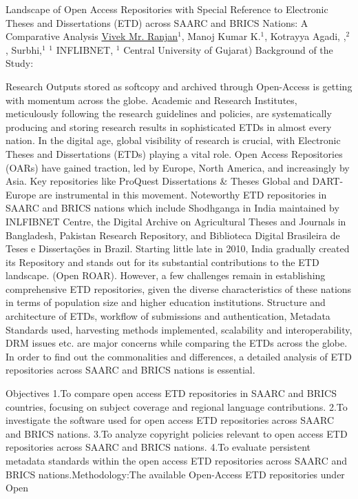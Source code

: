 
    \begin{abstract_online}{Landscape of Open Access Repositories with Special Reference to Electronic Theses and Dissertations (ETD) across SAARC and BRICS Nations:  A Comparative Analysis}{%
        \underline{Vivek Mr. Ranjan}$^{1}$, Manoj Kumar K.$^{1}$, Kotrayya Agadi, ,$^{2}$, Surbhi,$^{1}$}{%
        }{%
        $^1$ INFLIBNET,   $^1$ Central University of Gujarat)\newline{}
            }
	Background of the Study: 
	
	Research Outputs stored as softcopy and archived through Open-Access is getting with momentum across the globe. Academic and Research Institutes, meticulously following the research guidelines and policies, are systematically producing and storing research results in sophisticated ETDs in almost every nation. In the digital age, global visibility of research is crucial, with Electronic Theses and Dissertations (ETDs) playing a vital role. Open Access Repositories (OARs) have gained traction, led by Europe, North America, and increasingly by Asia. Key repositories like ProQuest Dissertations & Theses Global and DART-Europe are instrumental in this movement. Noteworthy ETD repositories in SAARC and BRICS nations which include Shodhganga in India maintained by INLFIBNET Centre, the Digital Archive on Agricultural Theses and Journals in Bangladesh, Pakistan Research Repository, and Biblioteca Digital Brasileira de Teses e Dissertações in Brazil. Starting little late in 2010, India gradually created its Repository and stands out for its substantial contributions to the ETD landscape. (Open ROAR). However, a few challenges remain in establishing comprehensive ETD repositories, given the diverse characteristics of these nations in terms of population size and higher education institutions. Structure and architecture of ETDs, workflow of submissions and authentication, Metadata Standards used, harvesting methods implemented, scalability and interoperability, DRM issues etc. are major concerns while comparing the ETDs across the globe. In order to find out the commonalities and differences, a detailed analysis of ETD repositories across SAARC and BRICS nations is essential.
	
	Objectives
	1.To compare open access ETD repositories in SAARC and BRICS countries, focusing on subject coverage and regional language contributions.
	2.To investigate the software used for open access ETD repositories across SAARC and BRICS nations.
	3.To analyze copyright policies relevant to open access ETD repositories across SAARC and BRICS nations.
	4.To evaluate persistent metadata standards within the open access ETD repositories across SAARC and BRICS nations.Methodology:The available Open-Access ETD repositories under Open 
	

\end{abstract_online}
